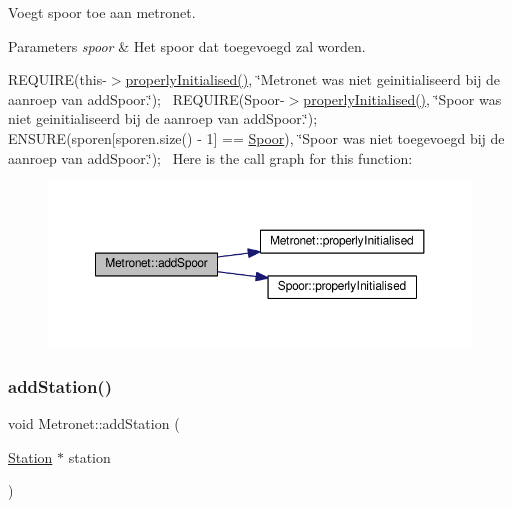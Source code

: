 Voegt spoor toe aan metronet. 


\begin{DoxyParams}{Parameters}
{\em spoor} & Het spoor dat toegevoegd zal worden.\\
\hline
\end{DoxyParams}
R\+E\+Q\+U\+I\+RE(this-\/$>$\hyperlink{class_metronet_a3d2adce29a947f162924279b766de645}{properly\+Initialised()}, \char`\"{}\+Metronet was niet geinitialiseerd bij de aanroep van add\+Spoor.\char`\"{});~\newline
R\+E\+Q\+U\+I\+RE(Spoor-\/$>$\hyperlink{class_metronet_a3d2adce29a947f162924279b766de645}{properly\+Initialised()}, \char`\"{}\+Spoor was niet geinitialiseerd bij de aanroep van add\+Spoor.\char`\"{});~\newline
E\+N\+S\+U\+RE(sporen\mbox{[}sporen.\+size() -\/ 1\mbox{]} == \hyperlink{class_spoor}{Spoor}), \char`\"{}\+Spoor was niet toegevoegd bij de aanroep van add\+Spoor.\char`\"{});~\newline
Here is the call graph for this function\+:
\nopagebreak
\begin{figure}[H]
\begin{center}
\leavevmode
\includegraphics[width=350pt]{class_metronet_a499d8ac62450fec83bc10101de53cd76_cgraph}
\end{center}
\end{figure}
\mbox{\label{class_metronet_ac7f4069e577cd4dddb1e166923df3ecb}} 
\subsubsection{\texorpdfstring{add\+Station()}{addStation()}}
{\footnotesize\ttfamily void Metronet\+::add\+Station (\begin{DoxyParamCaption}\item[{\hyperlink{class_station}{Station} $\ast$}]{station }\end{DoxyParamCaption})}



